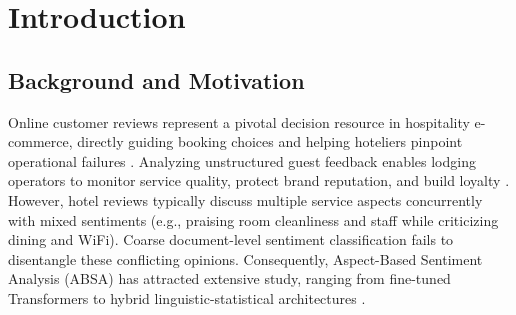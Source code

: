 \documentclass{llncs}
\begin{document}
\section{Introduction}
\label{sec:introduction}

\subsection{Background and Motivation}
\label{subsec:background}
Online customer reviews represent a pivotal decision resource in hospitality e-commerce, directly guiding booking choices \cite{ref20_vo2022} and helping hoteliers pinpoint operational failures \cite{ref21_llorens2023}. Analyzing unstructured guest feedback enables lodging operators to monitor service quality, protect brand reputation, and build loyalty \cite{ref19_tahir2024,ref26_piriyakul2024}. However, hotel reviews typically discuss multiple service aspects concurrently with mixed sentiments (e.g., praising room cleanliness and staff while criticizing dining and WiFi). Coarse document-level sentiment classification fails to disentangle these conflicting opinions. Consequently, Aspect-Based Sentiment Analysis (ABSA) has attracted extensive study, ranging from fine-tuned Transformers \cite{ref01_bimaputra2023} to hybrid linguistic-statistical architectures \cite{ref04_namee2023}.
\end{document}
